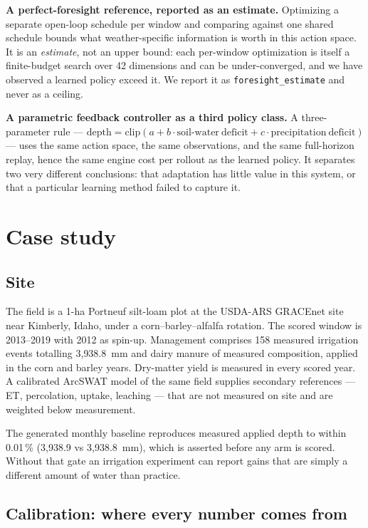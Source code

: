 \documentclass[a4paper,fleqn]{cas-sc}
\begin{document}
\textbf{A perfect-foresight reference, reported as an estimate.} Optimizing a separate
open-loop schedule per window and comparing against one shared schedule bounds what
weather-specific information is worth in this action space. It is an \emph{estimate},
not an upper bound: each per-window optimization is itself a finite-budget search over
42 dimensions and can be under-converged, and we have observed a learned policy exceed
it. We report it as \texttt{foresight\_estimate} and never as a ceiling.

\textbf{A parametric feedback controller as a third policy class.} A three-parameter
rule --- $\mathrm{depth} = \mathrm{clip}(a + b \cdot \mathrm{soil\text{-}water\ deficit}
+ c \cdot \mathrm{precipitation\ deficit})$ --- uses the same action space, the same
observations, and the same full-horizon replay, hence the same engine cost per rollout
as the learned policy. It separates two very different conclusions: that adaptation has
little value in this system, or that a particular learning method failed to capture it.

\section{Case study}\label{sec:casestudy}

\subsection{Site}\label{sec:site}

The field is a 1-ha Portneuf silt-loam plot at the USDA-ARS GRACEnet site near Kimberly,
Idaho, under a corn--barley--alfalfa rotation. The scored window is 2013--2019 with 2012
as spin-up. Management comprises 158 measured irrigation events totalling 3{,}938.8~mm
and dairy manure of measured composition, applied in the corn and barley years.
Dry-matter yield is measured in every scored year. A calibrated ArcSWAT model of the same
field supplies secondary references --- ET, percolation, uptake, leaching --- that are
not measured on site and are weighted below measurement.

The generated monthly baseline reproduces measured applied depth to within 0.01\,\%
(3{,}938.9 vs 3{,}938.8~mm), which is asserted before any arm is scored. Without that
gate an irrigation experiment can report gains that are simply a different amount of
water than practice.

\subsection{Calibration: where every number comes from}\label{sec:calibration}
\end{document}

